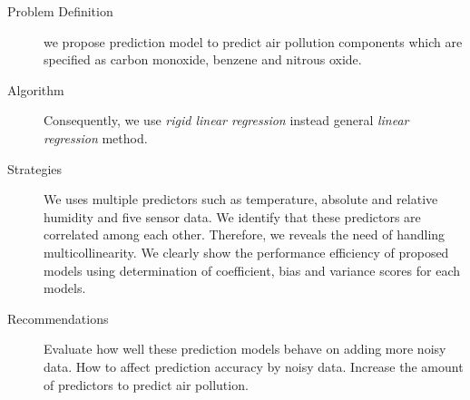 \documentclass{tikzposter} %
\begin{document}
\begin{columns}
{
\begin{description}
  \item[Problem Definition]
we propose prediction model to predict air
pollution components which are specified as carbon monoxide,
benzene and nitrous oxide. 

  \item[Algorithm]
  Consequently, we use \emph{rigid linear
regression} instead general \emph{linear regression} method. 

  \item[Strategies]
  We uses multiple predictors
such as temperature, absolute and relative humidity and five
sensor data. We identify that these predictors are correlated
among each other. Therefore, we reveals the need of handling
multicollinearity.  We clearly
show the performance efficiency of proposed models using
determination of coefficient, bias and variance scores for each
models.
\item[Recommendations]
Evaluate how
well these prediction models behave on adding more noisy data.
How to affect prediction accuracy by noisy data.
Increase the amount of
predictors to predict air pollution.
\end{description}
}





\end{columns}


\end{document}
